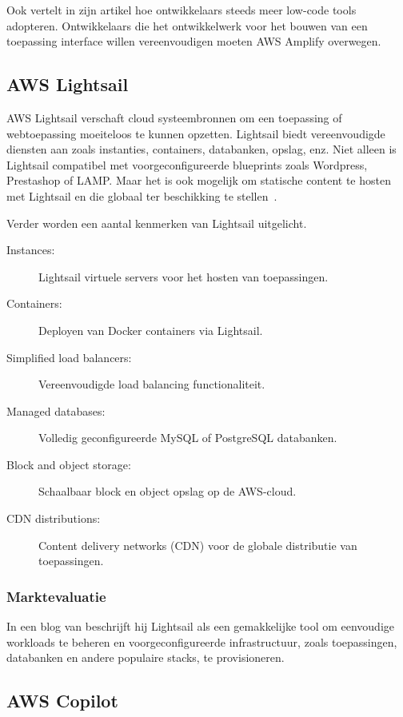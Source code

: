 Ook \textcite{Nwamba2022} vertelt in zijn artikel hoe ontwikkelaars steeds meer low-code tools adopteren.
Ontwikkelaars die het ontwikkelwerk voor het bouwen van een toepassing interface willen vereenvoudigen moeten AWS Amplify overwegen.

\subsection{AWS Lightsail}
\label{subsec:service-lightsail}

AWS Lightsail verschaft cloud systeembronnen om een toepassing of webtoepassing moeiteloos te kunnen opzetten.
Lightsail biedt vereenvoudigde diensten aan zoals instanties, containers, databanken, opslag, enz.
Niet alleen is Lightsail compatibel met voorgeconfigureerde blueprints zoals Wordpress, Prestashop of LAMP\@.
Maar het is ook mogelijk om statische content te hosten met Lightsail en die globaal ter beschikking te stellen~\autocite{AWSLightsail2022}.

Verder worden een aantal kenmerken van Lightsail uitgelicht.

\begin{description}
    \item[Instances: ] Lightsail virtuele servers voor het hosten van toepassingen.
    \item[Containers: ] Deployen van Docker containers via Lightsail.
    \item[Simplified load balancers: ] Vereenvoudigde load balancing functionaliteit.
    \item[Managed databases: ] Volledig geconfigureerde MySQL of PostgreSQL databanken.
    \item[Block and object storage: ] Schaalbaar block en object opslag op de AWS-cloud.
    \item[CDN distributions: ] Content delivery networks (CDN) voor de globale distributie van toepassingen.
\end{description}

\subsubsection{Marktevaluatie}

In een blog van \textcite{Warrier2022} beschrijft hij Lightsail als een gemakkelijke tool om eenvoudige workloads te beheren
en voorgeconfigureerde infrastructuur, zoals toepassingen, databanken en andere populaire stacks, te provisioneren.

\subsection{AWS Copilot}
\label{subsec:service-copilot}


